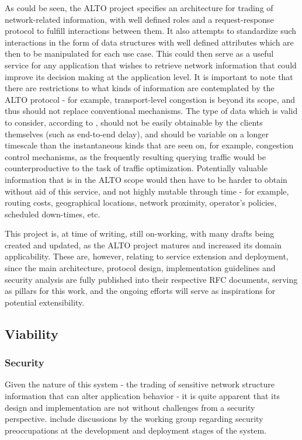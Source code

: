     As could be seen, the ALTO project specifies an architecture for trading of network-related information, with well defined roles and a request-response protocol to fulfill interactions between them.
    It also attempts to standardize such interactions in the form of data structures with well defined attributes which are then to be manipulated for each use case.
    This could then serve as a useful service for any application that wishes to retrieve network information that could improve its decision making at the application level.
    It is important to note that there are restrictions to what kinds of information are contemplated by the ALTO protocol - for example, transport-level congestion is beyond its scope, and thus should not replace conventional mechanisms.
    The type of data which is valid to consider, according to \cite{alto-problem-statement}, should not be easily obtainable by the clients themselves (such as end-to-end delay), and should be variable on a longer timescale than the instantaneous kinds that are seen on, for example, congestion control mechanisms, as the frequently resulting querying traffic would be counterproductive to the task of traffic optimization.
    Potentially valuable information that is in the ALTO scope would then have to be harder to obtain without aid of this service, and not highly mutable through time - for example, routing costs, geographical locations, network proximity, operator's policies, scheduled down-times, etc.

    This project is, at time of writing, still on-working, with many drafts being created and updated, as the ALTO project matures and increased its domain applicability.
    These are, however, relating to service extension and deployment, since the main architecture, protocol design, implementation guidelines and security analysis are fully published into their respective RFC documents, serving as pillars for this work, and the ongoing efforts will serve as inspirations for potential extensibility.

\subsection{Viability}

\subsubsection{Security}
\label{sssec:alto-security}

    Given the nature of this system - the trading of sensitive network structure information that can alter application behavior - it is quite apparent that its design and implementation are not without challenges from a security perspective.
    \cite{alto-problem-statement} \cite{alto-protocol} \cite{alto-deployment-considerations} include discussions by the working group regarding security preoccupations at the development and deployment stages of the system.

